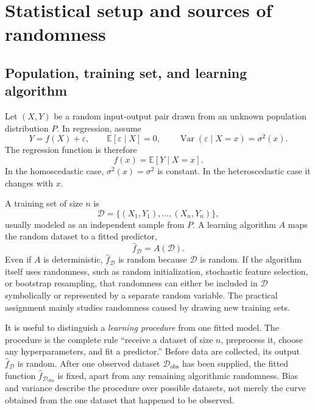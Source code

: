 \documentclass[11pt,a4paper]{article}
\begin{document}
\section{Statistical setup and sources of randomness}
\label{sec:setup}

\subsection{Population, training set, and learning algorithm}

Let $(X,Y)$ be a random input-output pair drawn from an unknown population distribution $P$. In regression, assume
\begin{equation}
  Y=f(X)+\varepsilon,
  \qquad
  \mathbb E[\varepsilon\mid X]=0,
  \qquad
  \operatorname{Var}(\varepsilon\mid X=x)=\sigma^2(x).
  \label{eq:data-model}
\end{equation}
The regression function is therefore
\begin{equation}
  f(x)=\mathbb E[Y\mid X=x].
\end{equation}
In the homoscedastic case, $\sigma^2(x)=\sigma^2$ is constant. In the heteroscedastic case it changes with $x$.

A training set of size $n$ is
\begin{equation}
  \mathcal D=\{(X_1,Y_1),\ldots,(X_n,Y_n)\},
\end{equation}
usually modeled as an independent sample from $P$. A learning algorithm $A$ maps the random dataset to a fitted predictor,
\begin{equation}
  \widehat f_{\mathcal D}=A(\mathcal D).
\end{equation}
Even if $A$ is deterministic, $\widehat f_{\mathcal D}$ is random because $\mathcal D$ is random. If the algorithm itself uses randomness, such as random initialization, stochastic feature selection, or bootstrap resampling, that randomness can either be included in $\mathcal D$ symbolically or represented by a separate random variable. The practical assignment mainly studies randomness caused by drawing new training sets.

It is useful to distinguish a \emph{learning procedure} from one fitted model. The procedure is the complete rule ``receive a dataset of size $n$, preprocess it, choose any hyperparameters, and fit a predictor.'' Before data are collected, its output $\widehat f_{\mathcal D}$ is random. After one observed dataset $\mathcal D_{\mathrm{obs}}$ has been supplied, the fitted function $\widehat f_{\mathcal D_{\mathrm{obs}}}$ is fixed, apart from any remaining algorithmic randomness. Bias and variance describe the procedure over possible datasets, not merely the curve obtained from the one dataset that happened to be observed.
\end{document}
